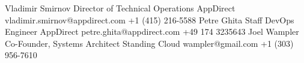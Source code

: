 
\begin{referees}
		{Vladimir Smirnov}
		{Director of Technical Operations}
		{AppDirect}
		{vladimir.smirnov@appdirect.com}
    {+1 (415) 216-5588}
		{Petre Ghita}
		{Staff DevOps Engineer}
		{AppDirect}
		{petre.ghita@appdirect.com}
    {+49 174 3235643}
		{Joel Wampler}
		{Co-Founder, Systems Architect}
		{Standing Cloud}
		{wampler@gmail.com}
    {+1 (303) 956-7610}
\end{referees}
